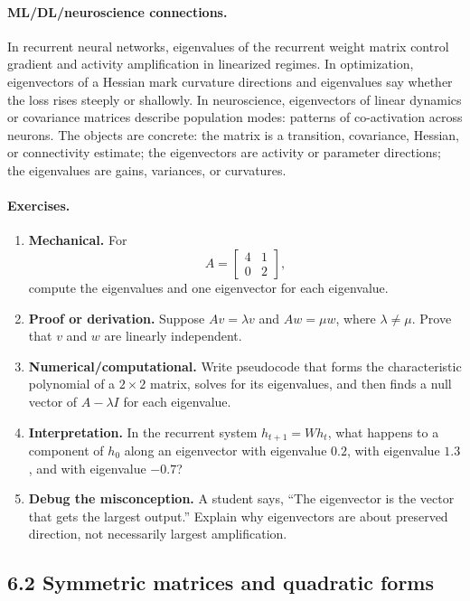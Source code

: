 \paragraph{ML/DL/neuroscience connections.}
In recurrent neural networks, eigenvalues of the recurrent weight matrix control gradient and activity amplification in linearized regimes. In optimization, eigenvectors of a Hessian mark curvature directions and eigenvalues say whether the loss rises steeply or shallowly. In neuroscience, eigenvectors of linear dynamics or covariance matrices describe population modes: patterns of co-activation across neurons. The objects are concrete: the matrix is a transition, covariance, Hessian, or connectivity estimate; the eigenvectors are activity or parameter directions; the eigenvalues are gains, variances, or curvatures.

\paragraph{Exercises.}
\begin{enumerate}[label=\textbf{6.1.\arabic*.}, leftmargin=*]
\item \textbf{Mechanical.} For
\[
A=\begin{bmatrix}4&1\\0&2\end{bmatrix},
\]
compute the eigenvalues and one eigenvector for each eigenvalue.
\item \textbf{Proof or derivation.} Suppose \(Av=\lambda v\) and \(Aw=\mu w\), where \(\lambda\neq\mu\). Prove that \(v\) and \(w\) are linearly independent.
\item \textbf{Numerical/computational.} Write pseudocode that forms the characteristic polynomial of a \(2\times 2\) matrix, solves for its eigenvalues, and then finds a null vector of \(A-\lambda I\) for each eigenvalue.
\item \textbf{Interpretation.} In the recurrent system \(h_{t+1}=Wh_t\), what happens to a component of \(h_0\) along an eigenvector with eigenvalue \(0.2\), with eigenvalue \(1.3\), and with eigenvalue \(-0.7\)?
\item \textbf{Debug the misconception.} A student says, ``The eigenvector is the vector that gets the largest output.'' Explain why eigenvectors are about preserved direction, not necessarily largest amplification.
\end{enumerate}

\subsection{6.2 Symmetric matrices and quadratic forms}

